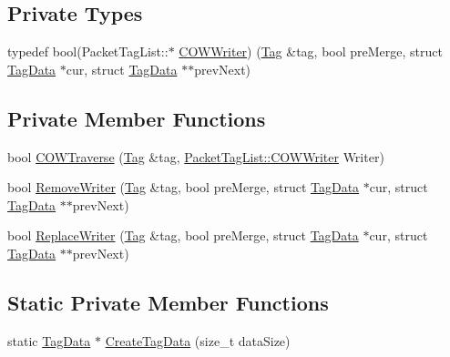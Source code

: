 \subsection*{Private Types}
\begin{DoxyCompactItemize}
\item 
typedef bool(Packet\+Tag\+List\+::$\ast$ \hyperlink{classns3_1_1PacketTagList_a79166d6e882aec38600fd64dbd4b9841}{C\+O\+W\+Writer}) (\hyperlink{classns3_1_1Tag}{Tag} \&tag, bool pre\+Merge, struct \hyperlink{structns3_1_1PacketTagList_1_1TagData}{Tag\+Data} $\ast$cur, struct \hyperlink{structns3_1_1PacketTagList_1_1TagData}{Tag\+Data} $\ast$$\ast$prev\+Next)
\end{DoxyCompactItemize}
\subsection*{Private Member Functions}
\begin{DoxyCompactItemize}
\item 
bool \hyperlink{classns3_1_1PacketTagList_a7d98f0fe590d22f8224d718af0ac9713}{C\+O\+W\+Traverse} (\hyperlink{classns3_1_1Tag}{Tag} \&tag, \hyperlink{classns3_1_1PacketTagList_a79166d6e882aec38600fd64dbd4b9841}{Packet\+Tag\+List\+::\+C\+O\+W\+Writer} Writer)
\item 
bool \hyperlink{classns3_1_1PacketTagList_aceea9c63e697635ba35564610a7150cc}{Remove\+Writer} (\hyperlink{classns3_1_1Tag}{Tag} \&tag, bool pre\+Merge, struct \hyperlink{structns3_1_1PacketTagList_1_1TagData}{Tag\+Data} $\ast$cur, struct \hyperlink{structns3_1_1PacketTagList_1_1TagData}{Tag\+Data} $\ast$$\ast$prev\+Next)
\item 
bool \hyperlink{classns3_1_1PacketTagList_a21cfeb795e3ef3a688d6114272d41c53}{Replace\+Writer} (\hyperlink{classns3_1_1Tag}{Tag} \&tag, bool pre\+Merge, struct \hyperlink{structns3_1_1PacketTagList_1_1TagData}{Tag\+Data} $\ast$cur, struct \hyperlink{structns3_1_1PacketTagList_1_1TagData}{Tag\+Data} $\ast$$\ast$prev\+Next)
\end{DoxyCompactItemize}
\subsection*{Static Private Member Functions}
\begin{DoxyCompactItemize}
\item 
static \hyperlink{structns3_1_1PacketTagList_1_1TagData}{Tag\+Data} $\ast$ \hyperlink{classns3_1_1PacketTagList_abfab9cfb3a21336e2f7962cc51fcff94}{Create\+Tag\+Data} (size\+\_\+t data\+Size)
\end{DoxyCompactItemize}
